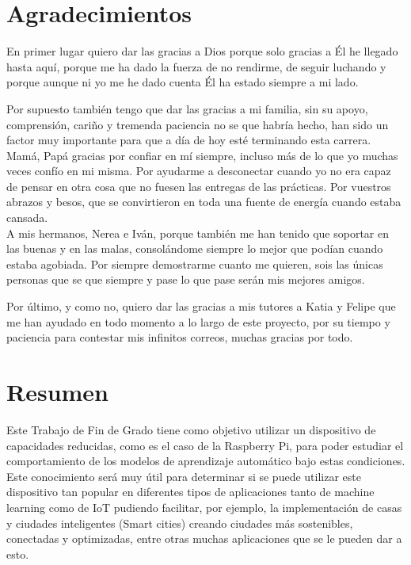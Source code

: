 \documentclass[a4paper, 12pt]{book}
\begin{document}

\chapter*{Agradecimientos}

En primer lugar quiero dar las gracias a Dios porque solo gracias a Él he llegado hasta aquí, porque me ha dado la fuerza de no rendirme, de seguir luchando y porque aunque ni yo me he dado cuenta Él ha estado siempre a mi lado.

Por supuesto también tengo que dar las gracias a mi familia, sin su apoyo, comprensión, cariño y tremenda paciencia no se que habría hecho, han sido un factor muy importante para que a día de hoy esté terminando esta carrera. Mamá, Papá gracias por confiar en mí siempre, incluso más de lo que yo muchas veces confío en mi misma. Por ayudarme a desconectar cuando yo no era capaz de pensar en otra cosa que no fuesen las entregas de las prácticas. Por vuestros abrazos y besos, que se convirtieron en toda una fuente de energía cuando estaba cansada. \\
A mis hermanos, Nerea e Iván, porque también me han tenido que soportar en las buenas y en las malas, consolándome siempre lo mejor que podían cuando estaba agobiada. Por siempre demostrarme cuanto me quieren, sois las únicas personas que se que siempre y pase lo que pase serán mis mejores amigos.

Por último, y como no, quiero dar las gracias a mis tutores a Katia y Felipe que me han ayudado en todo momento a lo largo de este proyecto, por su tiempo y paciencia para contestar mis infinitos correos, muchas gracias por todo.



\chapter*{Resumen}

Este Trabajo de Fin de Grado tiene como objetivo utilizar un dispositivo de capacidades reducidas, como es el caso de la Raspberry Pi, para poder estudiar el comportamiento de los modelos de aprendizaje automático bajo estas condiciones. Este conocimiento será muy útil para determinar si se puede utilizar este dispositivo tan popular en diferentes tipos de aplicaciones tanto de machine learning como de IoT pudiendo facilitar, por ejemplo, la implementación de casas y ciudades inteligentes (Smart cities) creando ciudades más sostenibles, conectadas y optimizadas, entre otras muchas aplicaciones que se le pueden dar a esto.
\end{document}
